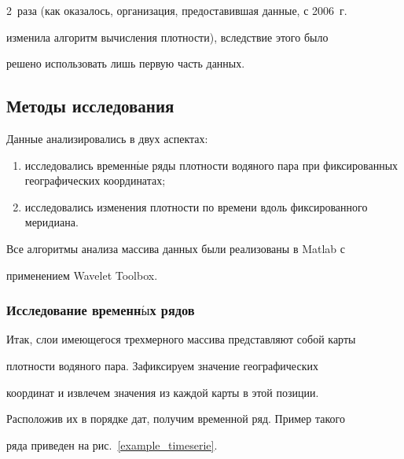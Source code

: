 2~раза (как оказалось, организация, предоставившая данные, с 2006~г.\

изменила алгоритм вычисления плотности), вследствие этого было

решено использовать лишь первую часть данных. 



\subsection{Методы исследования}



Данные анализировались в двух аспектах:

\begin{enumerate}[(1)]

    \item исследовались временн$\acute{\mbox{ы}}$е ряды плотности водяного пара при фиксированных географических координатах;

    \item  исследовались изменения плотности по времени вдоль фиксированного меридиана.

\end{enumerate}



Все алгоритмы анализа массива данных были реализованы в Matlab с

применением Wavelet Toolbox.



\subsubsection{Исследование временн$\acute{\mbox{ы}}$х рядов}



Итак, слои имеющегося трехмерного массива представляют собой карты

плотности водяного пара. Зафиксируем значение географических

координат и извлечем значения из каждой карты в этой позиции.

Расположив их в порядке дат, получим временной ряд. Пример такого

ряда приведен на рис.~\ref{example_timeserie}.



